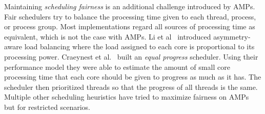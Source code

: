 Maintaining \emph{scheduling fairness} is an additional challenge introduced by AMPs. Fair schedulers try to balance the processing time given to each thread, process, or process group. Most implementations regard all sources of processing time as equivalent, which is not the case with AMPs. Li et al~\cite{li2007efficient} introduced asymmetry-aware load balancing where the load assigned to each core is proportional to its processing power. Craeynest et al.~\cite{van2013fairness} built an \emph{equal progress} scheduler. Using their performance model they were able to estimate the amount of small core processing time that each core should be given to progress as much as it has. The scheduler then prioritized threads so that the progress of all threads is the same. Multiple other scheduling heuristics have tried to maximize fairness on AMPs~\cite{zahedi2018amdahl,wang2016rebudget,kim2018exploring} but for restricted scenarios.


